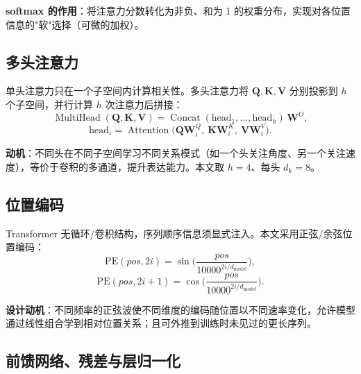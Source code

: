 \documentclass[11pt,a4paper]{article}
\begin{document}
\textbf{softmax 的作用}：将注意力分数转化为非负、和为 1 的权重分布，实现对各位置信息的"软"选择（可微的加权）。

\subsection{多头注意力}

单头注意力只在一个子空间内计算相关性。多头注意力将 $\mathbf Q, \mathbf K, \mathbf V$ 分别投影到 $h$ 个子空间，并行计算 $h$ 次注意力后拼接：
\begin{equation}
    \operatorname{MultiHead}(\mathbf Q, \mathbf K, \mathbf V)
    = \operatorname{Concat}(\mathrm{head}_1, \dots, \mathrm{head}_h)\,\mathbf W^O ,
\end{equation}
\begin{equation}
    \mathrm{head}_i = \operatorname{Attention}\big(\mathbf Q\mathbf W_i^Q,\ \mathbf K\mathbf W_i^K,\ \mathbf V\mathbf W_i^V\big) .
\end{equation}

\textbf{动机}：不同头在不同子空间学习不同关系模式（如一个头关注角度、另一个关注速度），等价于卷积的多通道，提升表达能力。本文取 $h = 4$、每头 $d_k = 8$。

\subsection{位置编码}

Transformer 无循环/卷积结构，序列顺序信息须显式注入。本文采用正弦/余弦位置编码：
\begin{equation}
    \mathrm{PE}(pos, 2i) = \sin\!\Big(\frac{pos}{10000^{2i/d_{\mathrm{model}}}}\Big),
\end{equation}
\begin{equation}
    \mathrm{PE}(pos, 2i+1) = \cos\!\Big(\frac{pos}{10000^{2i/d_{\mathrm{model}}}}\Big) .
\end{equation}

\textbf{设计动机}：不同频率的正弦波使不同维度的编码随位置以不同速率变化，允许模型通过线性组合学到相对位置关系；且可外推到训练时未见过的更长序列。

\subsection{前馈网络、残差与层归一化}
\end{document}
